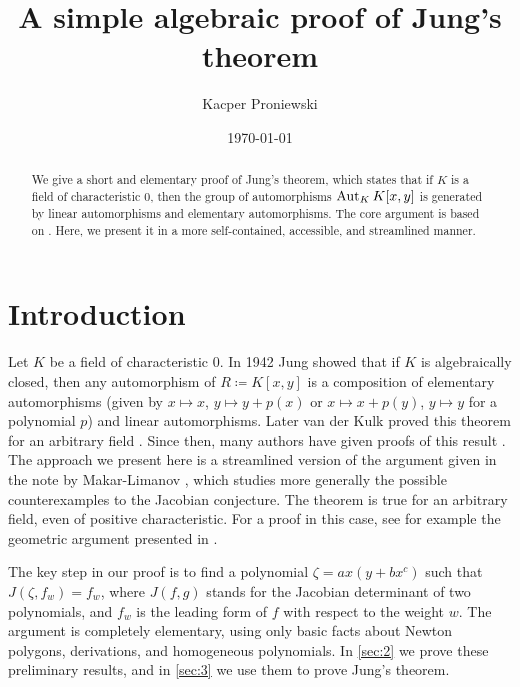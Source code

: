 \documentclass[a4paper,10pt]{amsart}
\begin{document}
\title{A simple algebraic proof of Jung's theorem}

\author{Kacper Proniewski}
\address{Institute of Mathematics,
  Jagiellonian University, Kraków, Poland}

\date{\today}

\begin{abstract}
  We give a short and elementary proof of Jung's theorem, which states that if \(K\) is a field of characteristic 0, then the group of automorphisms \(\operatorname{Aut}_K K[x,y]\) is generated by
  linear automorphisms
  and elementary automorphisms. The core argument is based on \autocite{ML2014}. Here, we present it in a more self-contained, accessible, and streamlined manner.
\end{abstract}

\maketitle

\section{Introduction}
Let \(K\) be a field of characteristic 0. In 1942 Jung
\autocite{J42} showed that if \(K\) is algebraically closed, then any automorphism of \(R\coloneqq K[x,y]\)
is a composition of elementary automorphisms
(given by \(x\mapsto x\), \(y\mapsto y+p(x)\) or \(x\mapsto x+p(y)\), \(y\mapsto y\) for a polynomial \(p\))
and linear automorphisms. Later van der Kulk proved this theorem for an arbitrary field \autocite{vdK53}.
Since then, many authors have given proofs of this result
\autocite{SL02, AM75, Gut61, MW88, Nag72, NVC03, Ren68, VGG14}.
The approach we present here is a streamlined version of the argument given in the note by Makar-Limanov \autocite{ML2014}, which studies more generally the possible counterexamples to the
Jacobian conjecture.
The theorem is true for an arbitrary field, even of positive characteristic. For a proof in this case, see for example the geometric argument presented in \autocite{SL02}.

The key step in our proof is to find a polynomial \(\zeta=ax(y+bx^c)\) such that \(J(\zeta, f_w)=f_w\), where \(J(f,g)\) stands for the Jacobian determinant of two polynomials, and \(f_w\) is 
the leading form of \(f\) with respect to the weight \(w\).
The argument is completely elementary, using only basic facts about Newton polygons, derivations, and homogeneous polynomials. In \cref{sec:2} 
we prove these preliminary results, and in \cref{sec:3} we use them to prove Jung's theorem.
\end{document}
